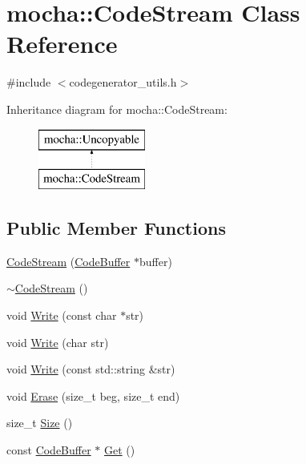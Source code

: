 \hypertarget{classmocha_1_1_code_stream}{
\section{mocha::CodeStream Class Reference}
\label{classmocha_1_1_code_stream}
}


{\ttfamily \#include $<$codegenerator\_\-utils.h$>$}

Inheritance diagram for mocha::CodeStream:\begin{figure}[H]
\begin{center}
\leavevmode
\includegraphics[height=2.000000cm]{classmocha_1_1_code_stream}
\end{center}
\end{figure}
\subsection*{Public Member Functions}
\begin{DoxyCompactItemize}
\item 
\hyperlink{classmocha_1_1_code_stream_ae0e5c3f5599c97bc1354e549b1f202a4}{CodeStream} (\hyperlink{classmocha_1_1_code_buffer}{CodeBuffer} $\ast$buffer)
\item 
\hyperlink{classmocha_1_1_code_stream_a9446e463e9c2adf3c505fbc2a05695f0}{$\sim$CodeStream} ()
\item 
void \hyperlink{classmocha_1_1_code_stream_ac351b0f42bbbfb97b9ee40fd1248a02d}{Write} (const char $\ast$str)
\item 
void \hyperlink{classmocha_1_1_code_stream_a69fa6bd2d319de1d5f5f2c016c95b243}{Write} (char str)
\item 
void \hyperlink{classmocha_1_1_code_stream_a67192401b9f1a1fe958f1a90c3a7cd42}{Write} (const std::string \&str)
\item 
void \hyperlink{classmocha_1_1_code_stream_abee24daebb502e307b9b68f62de6f859}{Erase} (size\_\-t beg, size\_\-t end)
\item 
size\_\-t \hyperlink{classmocha_1_1_code_stream_aed17227c989668c2449042a31acfecf6}{Size} ()
\item 
const \hyperlink{classmocha_1_1_code_buffer}{CodeBuffer} $\ast$ \hyperlink{classmocha_1_1_code_stream_ad78d4b93ca9ce0c99c39d7d33ada7b68}{Get} ()
\end{DoxyCompactItemize}
